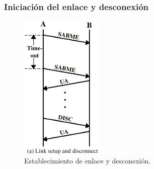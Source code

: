 \documentclass[withindex,glossary]{cam-thesis}
\begin{document}

\subsubsection{Iniciación del enlace y desconexión}

\begin{figure}[H]
\centering
\includegraphics[height=7.0cm]{images/HDLC_SetupDisconnect}
\caption[Establecimiento de enlace y desconexión]{Establecimiento de enlace y desconexión.}
\end{figure}
\end{document}
